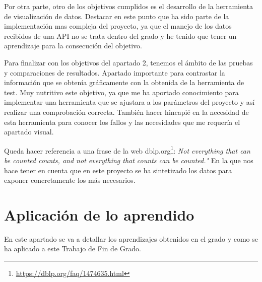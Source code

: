 \documentclass[a4paper, 12pt]{book}
\begin{document}
Por otra parte, otro de los objetivos cumplidos es el desarrollo de la herramienta de visualización de datos. Destacar en este punto que ha sido parte de la implementación mas compleja del proyecto, ya que el manejo de los datos recibidos de una API no se trata dentro del grado y he tenido que tener un aprendizaje para la consecución del objetivo. 

Para finalizar con los objetivos del apartado 2, tenemos el ámbito de las pruebas y comparaciones de resultados. Apartado importante para contrastar la información que se obtenía gráficamente con la obtenida de la herramienta de test. Muy nutritivo este objetivo, ya que me ha aportado conocimiento para implementar una herramienta que se ajustara a los parámetros del proyecto y así realizar una comprobación correcta.
También hacer hincapié en la necesidad de esta herramienta para conocer los fallos y las necesidades que me requería el apartado visual.

Queda hacer referencia a una frase de la web dblp.org\footnote{\url{https://dblp.org/faq/1474635.html}}: \textit{Not everything that can be counted counts, and not everything that counts can be counted."} En la que nos hace tener en cuenta que en este proyecto se ha sintetizado los datos para exponer concretamente los más necesarios.




\section{Aplicación de lo aprendido}
\label{sec:aplicacion}

En este apartado se va a detallar los aprendizajes obtenidos en el grado y como se ha aplicado a este Trabajo de Fin de Grado.
\end{document}
